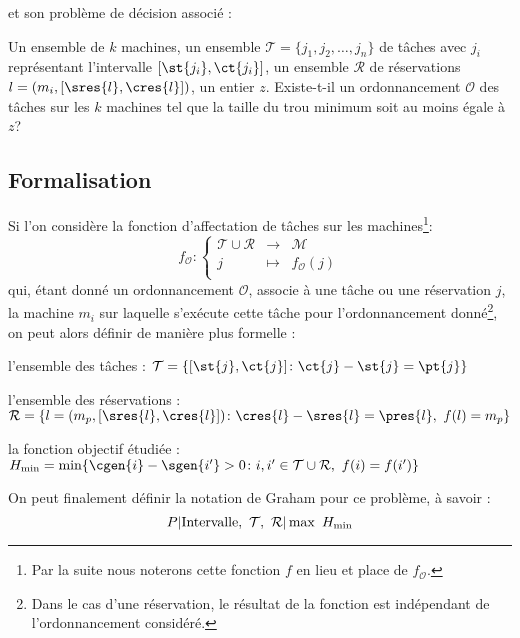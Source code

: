 \documentclass[a4paper,9pt]{book}
\begin{document}
et son problème de décision associé :

\dfdec{\fischedpi}
{Un ensemble de $k$ machines, un ensemble $\mathcal{T} = \{j_1, j_2, \dots, j_n\}$ de tâches avec
    $j_i$ représentant l'intervalle $[\st{j_i}, \ct{j_i}]$, un ensemble $\mathcal{R}$ de
réservations $l = (m_i, [\sres{l}, \cres{l}])$, un entier $z$.}
{Existe-t-il un ordonnancement $\mathcal{O}$ des tâches sur les $k$ machines tel que la taille du
trou minimum soit au moins égale à $z$?}

\subsection{Formalisation}
    Si l'on considère la fonction d'affectation de tâches sur les machines\footnote{Par la suite
    nous noterons cette fonction $f$ en lieu et place de $f_{\mathcal{O}}$.}: \[
        f_{\mathcal{O}} : \left \lbrace \begin{array}{rcl}
            \mathcal{T} \cup \mathcal{R} & \longrightarrow & \mathcal{M} \\
            j & \mapsto & f_{\mathcal{O}}(j) \\
        \end{array}
        \right .
    \]
    qui, étant donné un ordonnancement $\mathcal{O}$, associe à une tâche ou une réservation $j$, la
    machine $m_i$ sur laquelle s'exécute cette tâche pour l'ordonnancement donné\footnote{Dans le
    cas d'une réservation, le résultat de la fonction est indépendant de l'ordonnancement
    considéré.}, on peut alors définir de manière plus formelle : \begin{bitemize}
        \item l'ensemble des tâches : \hfill $ \mathcal{T} = \{[\st{j}, \ct{j}]   \colon  
            \ct{j} - \st{j} = \pt{j} \} $
        \item l'ensemble des réservations : \hfill $\mathcal{R} = \{l = (m_p, [\sres{l}, \cres{l}])  
            \colon   \cres{l} - \sres{l} = \pres{l},\ f(l) = m_p\}$
        \item la fonction objectif étudiée : \hfill $H_{\min} = \min \{ \cgen{i} - \sgen{i'} > 0  
            \colon   i,i' \in \mathcal{T} \cup \mathcal{R},\ f(i) = f(i')\}$
    \end{bitemize}

    On peut finalement définir la notation de Graham pour ce problème, à savoir : \[
        P \arrowvert \mbox{Intervalle},\ \mathcal{T},\ \mathcal{R} \arrowvert \max\ H_{\min}
    \]
\end{document}
